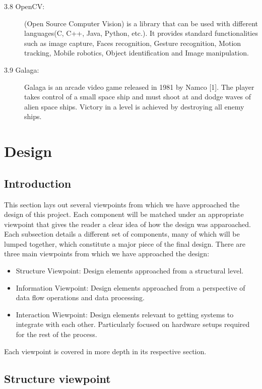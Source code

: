 \documentclass{scrreprt}
\begin{document}
\begin{description}
  \item[3.8 OpenCV:] (Open Source Computer Vision) is a library that can be used with different languages(C, C++, Java, Python, etc.). It provides standard functionalities such as image capture, Faces recognition, Gesture recognition, Motion tracking, Mobile robotics, Object identification and Image manipulation.

  \item[3.9 Galaga:] Galaga is an arcade video game released in 1981 by Namco [1]. The player takes control of a small space ship and must shoot at and dodge waves of alien space ships.
Victory in a level is achieved by destroying all enemy ships.

\end{description}

\chapter{Design}

\section{Introduction}

This section lays out several viewpoints from which we have approached the design of this project.
Each component will be matched under an appropriate viewpoint that gives the reader a clear idea of how the design was apparoached.
Each subsection details a different set of components, many of which will be lumped together, which constitute a major piece of the final design.
There are three main viewpoints from which we have approached the design:
\begin{itemize}
  \item Structure Viewpoint: Design elements approached from a structural level.

  \item Information Viewpoint: Design elements approached from a perspective of data flow operations and data processing.

  \item Interaction Wiewpoint: Design elements relevant to getting systems to integrate with each other. Particularly focused on hardware setups required for the rest of the process.
\end{itemize}

Each viewpoint is covered in more depth in its respective section.

\section{Structure viewpoint}%
\end{document}
